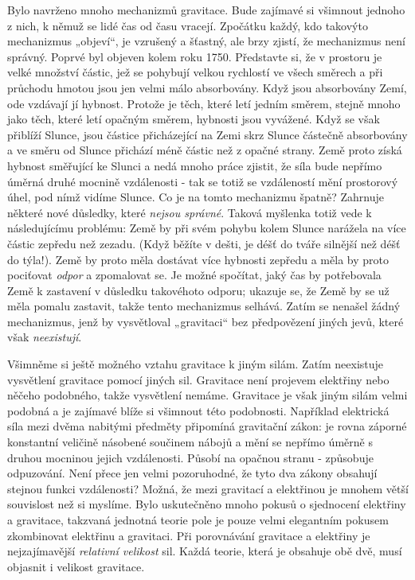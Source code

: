 {    Bylo navrženo mnoho mechanizmů gravitace. Bude zajímavé si všimnout jednoho z nich, k němuž se 
    lidé čas od času vracejí. Zpočátku každý, kdo takovýto mechanizmus „objeví“, je vzrušený a 
    šťastný, ale brzy zjistí, že mechanizmus není správný. Poprvé byl objeven kolem roku 
    \num{1750}. Představte si, že v prostoru je velké množství částic, jež se pohybují velkou 
    rychlostí ve všech směrech a při průchodu hmotou jsou jen velmi málo absorbovány. Když jsou 
    absorbovány Zemí, ode vzdávají jí hybnost. Protože je těch, které letí jedním směrem, stejně 
    mnoho jako těch, které letí opačným směrem, hybnosti jsou vyvážené. Když se však přiblíží 
    Slunce, jsou částice přicházející na Zemi skrz Slunce částečně absorbovány a ve směru od Slunce 
    přichází méně částic než z opačné strany. Země proto získá hybnost směřující ke Slunci a nedá 
    mnoho práce zjistit, že síla bude nepřímo úměrná druhé mocnině vzdálenosti - tak se totiž se 
    vzdáleností mění prostorový úhel, pod nímž vidíme Slunce. Co je na tomto mechanizmu špatně? 
    Zahrnuje některé nové důsledky, které \emph{nejsou správné}. Taková myšlenka totiž vede k 
    následujícímu problému: Země by při svém pohybu kolem Slunce narážela na více částic zepředu 
    než zezadu. (Když běžíte v dešti, je déšť do tváře silnější než déšť do týla!). Země by proto 
    měla dostávat více hybnosti zepředu a měla by proto pociťovat \emph{odpor} a zpomalovat se. Je 
    možné spočítat, jaký čas by potřebovala Země k zastavení v důsledku takovéhoto odporu; ukazuje 
    se, že Země by se už měla pomalu zastavit, takže tento mechanizmus selhává. Zatím se nenašel 
    žádný mechanizmus, jenž by vysvětloval „gravitaci“ bez předpovězení jiných jevů, které však 
    \emph{neexistují}.
    
    Všimněme si ještě možného vztahu gravitace k jiným silám. Zatím neexistuje vysvětlení gravitace 
    pomocí jiných sil. Gravitace není projevem elektřiny nebo něčeho podobného, takže vysvětlení 
    nemáme. Gravitace je však jiným silám velmi podobná a je zajímavé blíže si všimnout této 
    podobnosti. Například elektrická síla mezi dvěma nabitými předměty připomíná gravitační zákon: 
    je rovna záporné konstantní veličině násobené součinem nábojů a mění se nepřímo úměrně s druhou 
    mocninou jejich vzdálenosti. Působí na opačnou stranu - způsobuje odpuzování. Není přece jen 
    velmi pozoruhodné, že tyto dva zákony obsahují stejnou funkci vzdálenosti? Možná, že mezi 
    gravitací a elektřinou je mnohem větší souvislost než si myslíme. Bylo uskutečněno mnoho pokusů 
    o sjednocení elektřiny a gravitace, takzvaná jednotná teorie pole je pouze velmi elegantním 
    pokusem zkombinovat elektřinu a gravitaci. Při porovnávání gravitace a elektřiny je 
    nejzajímavější \emph{relativní velikost} sil. Každá teorie, která je obsahuje obě dvě, musí 
    objasnit i velikost gravitace.
    
}
